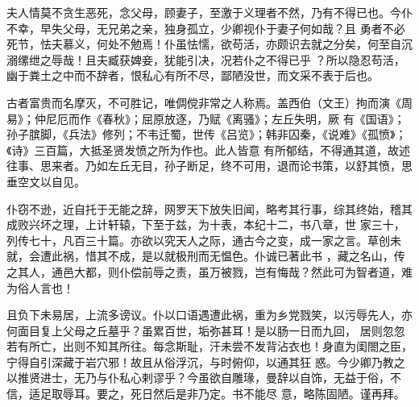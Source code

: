 夫人情莫不贪生恶死，念父母，顾妻子，至激于义理者不然，乃有不得已也。今仆不幸，早失父母，无兄弟之亲，独身孤立，少卿视仆于妻子何如哉？且
勇者不必死节，怯夫慕义，何处不勉焉！仆虽怯懦，欲苟活，亦颇识去就之分矣，何至自沉溺缧绁之辱哉！且夫臧获婢妾，犹能引决，况若仆之不得已乎
？所以隐忍苟活，幽于粪土之中而不辞者，恨私心有所不尽，鄙陋没世，而文采不表于后也。


古者富贵而名摩灭，不可胜记，唯倜傥非常之人称焉。盖西伯（文王）拘而演《周易》；仲尼厄而作《春秋》；屈原放逐，乃赋《离骚》；左丘失明，厥
有《国语》；孙子膑脚，《兵法》修列；不韦迁蜀，世传《吕览》；韩非囚秦，《说难》《孤愤》；《诗》三百篇，大抵圣贤发愤之所为作也。此人皆意
有所郁结，不得通其道，故述往事、思来者。乃如左丘无目，孙子断足，终不可用，退而论书策，以舒其愤，思垂空文以自见。


仆窃不逊，近自托于无能之辞，网罗天下放失旧闻，略考其行事，综其终始，稽其成败兴坏之理，上计轩辕，下至于兹，为十表，本纪十二，书八章，世
家三十，列传七十，凡百三十篇。亦欲以究天人之际，通古今之变，成一家之言。草创未就，会遭此祸，惜其不成，是以就极刑而无愠色。仆诚已著此书
，藏之名山，传之其人，通邑大都，则仆偿前辱之责，虽万被戮，岂有悔哉？然此可为智者道，难为俗人言也！


且负下未易居，上流多谤议。仆以口语遇遭此祸，重为乡党戮笑，以污辱先人，亦何面目复上父母之丘墓乎？虽累百世，垢弥甚耳！是以肠一日而九回，
居则忽忽若有所亡，出则不知其所往。每念斯耻，汗未尝不发背沾衣也！身直为闺閤之臣，宁得自引深藏于岩穴邪！故且从俗浮沉，与时俯仰，以通其狂
惑。今少卿乃教之以推贤进士，无乃与仆私心剌谬乎？今虽欲自雕瑑，曼辞以自饰，无益于俗，不信，适足取辱耳。要之，死日然后是非乃定。书不能尽
意，略陈固陋。谨再拜。